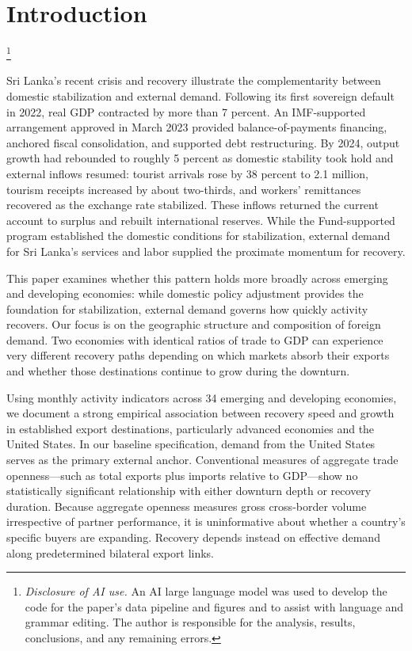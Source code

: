 \documentclass[12pt, a4paper]{article}
\newcommand\blfootnote[1]{%
  \begingroup
  \renewcommand\thefootnote{}\footnote{#1}%
  \addtocounter{footnote}{-1}%
  \endgroup
}
\begin{document}
\section{Introduction} \blfootnote{\emph{Disclosure of AI use.} An AI large language model was used to develop the code for the paper's data pipeline and figures and to assist with language and grammar editing. The author is responsible for the analysis, results, conclusions, and any remaining errors.}
Sri Lanka's recent crisis and recovery illustrate the complementarity between domestic stabilization and external demand. Following its first sovereign default in 2022, real GDP contracted by more than 7 percent. An IMF-supported arrangement approved in March 2023 provided balance-of-payments financing, anchored fiscal consolidation, and supported debt restructuring. By 2024, output growth had rebounded to roughly 5 percent as domestic stability took hold and external inflows resumed: tourist arrivals rose by 38 percent to 2.1 million, tourism receipts increased by about two-thirds, and workers' remittances recovered as the exchange rate stabilized. These inflows returned the current account to surplus and rebuilt international reserves. While the Fund-supported program established the domestic conditions for stabilization, external demand for Sri Lanka's services and labor supplied the proximate momentum for recovery.

This paper examines whether this pattern holds more broadly across emerging and developing economies: while domestic policy adjustment provides the foundation for stabilization, external demand governs how quickly activity recovers. Our focus is on the geographic structure and composition of foreign demand. Two economies with identical ratios of trade to GDP can experience very different recovery paths depending on which markets absorb their exports and whether those destinations continue to grow during the downturn.

Using monthly activity indicators across 34 emerging and developing economies, we document a strong empirical association between recovery speed and growth in established export destinations, particularly advanced economies and the United States. In our baseline specification, demand from the United States serves as the primary external anchor. Conventional measures of aggregate trade openness---such as total exports plus imports relative to GDP---show no statistically significant relationship with either downturn depth or recovery duration. Because aggregate openness measures gross cross-border volume irrespective of partner performance, it is uninformative about whether a country's specific buyers are expanding. Recovery depends instead on effective demand along predetermined bilateral export links.
\end{document}
